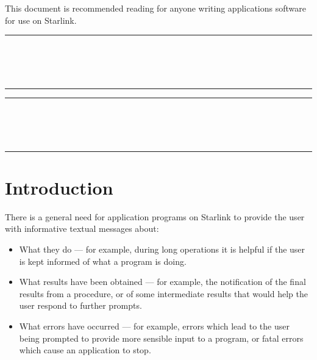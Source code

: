 This document is recommended reading for anyone writing applications
software for use on Starlink.

\newpage
\markright{\stardocname}
\null\vspace {5mm}
\begin {center}
\rule{80mm}{0.5mm} \\ [1ex]
{\Large\bf \stardoctitle \\ [2.5ex]
           \stardocversion} \\ [2ex]
\rule{80mm}{0.5mm}
\end{center}
\vspace{30mm}

\setlength{\parskip}{0mm}
\tableofcontents
\setlength{\parskip}{\medskipamount}

\newpage
\renewcommand{\thepage}{\arabic{page}}
\setcounter{page}{1}

\null\vspace {5mm}
\begin {center}
\rule{80mm}{0.5mm} \\ [1ex]
{\Large\bf \stardoctitle \\ [2.5ex]
           \stardocversion} \\ [2ex]
\rule{80mm}{0.5mm}
\end{center}
\vspace{30mm}

\section {Introduction}

There is a general need for application programs on Starlink to provide the
user with informative textual messages about:

\begin {itemize}
\item What they do --- for example, during long operations it is helpful if the
user is kept informed of what a program is doing.

\item What results have been obtained --- for example, the notification of  the
final results from a procedure, or of some intermediate results that would help
the user respond to further prompts. 

\item What errors have occurred --- for example, errors which lead to the user
being prompted to provide more sensible input to a program, or fatal
errors which cause an application to stop.
\end {itemize}

